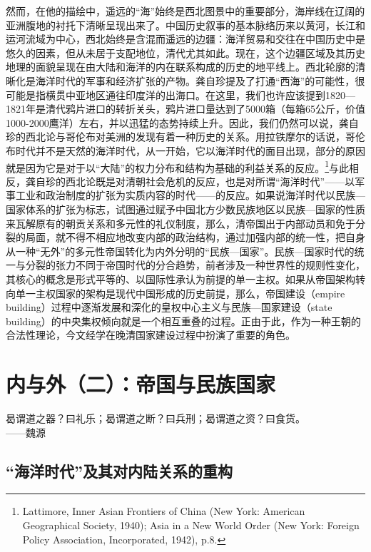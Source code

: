 \documentclass[a4paper, 12pt, openright]{ctexbook}
\renewenvironment{quote}
  {\list{}{\rightmargin2\ccwd \leftmargin2\ccwd \itemindent=2\ccwd \listparindent=2\ccwd}%
   \item\relax\small\kaishu\color{black}}
  {\endlist}
\begin{document}
然而，在他的描绘中，遥远的“海”始终是西北图景中的重要部分，海岸线在辽阔的亚洲腹地的衬托下清晰呈现出来了。中国历史叙事的基本脉络历来以黄河，长江和运河流域为中心，西北始终是含混而遥远的边疆：海洋贸易和交往在中国历史中是悠久的因素，但从未居于支配地位，清代尤其如此。现在，这个边疆区域及其历史地理的面貌呈现在由大陆和海洋的内在联系构成的历史的地平线上。西北轮廓的清晰化是海洋时代的军事和经济扩张的产物。龚自珍提及了打通“西海”的可能性，很可能是指横贯中亚地区通往印度洋的出海口。在这里，我们也许应该提到1820—1821年是清代鸦片进口的转折关头，鸦片进口量达到了5000箱（每箱65公斤，价值1000-2000鹰洋）左右，并以迅猛的态势持续上升。因此，我们仍然可以说，龚自珍的西北论与哥伦布对美洲的发现有着一种历史的关系。用拉铁摩尔的话说，哥伦布时代并不是天然的海洋时代，从一开始，它以海洋时代的面目出现，部分的原因就是因为它是对于以“大陆”的权力分布和结构为基础的利益关系的反应。\footnote{Lattimore, Inner Asian Frontiers of China (New York: American Geographical Society, 1940); Asia in a New World Order (New York: Foreign Policy Association, Incorporated, 1942), p.8.}与此相反，龚自珍的西北论既是对清朝社会危机的反应，也是对所谓“海洋时代”——以军事工业和政治制度的扩张为实质内容的时代——的反应。如果说海洋时代以民族—国家体系的扩张为标志，试图通过赋予中国北方少数民族地区以民族—国家的性质来瓦解原有的朝贡关系和多元性的礼仪制度，那么，清帝国出于内部动员和免于分裂的局面，就不得不相应地改变内部的政治结构，通过加强内部的统一性，把自身从一种“无外”的多元性帝国转化为内外分明的“民族—国家”。民族—国家时代的统一与分裂的张力不同于帝国时代的分合趋势，前者涉及一种世界性的规则性变化，其核心的概念是形式平等的、以国际性承认为前提的单一主权。如果从帝国架构转向单一主权国家的架构是现代中国形成的历史前提，那么，帝国建设（empire building）过程中逐渐发展和深化的皇权中心主义与民族—国家建设（state building）的中央集权倾向就是一个相互重叠的过程。正由于此，作为一种王朝的合法性理论，今文经学在晚清国家建设过程中扮演了重要的角色。

\chapter{内与外（二）：帝国与民族国家}

\begin{quote}
曷谓道之器？曰礼乐；曷谓道之断？曰兵刑；曷谓道之资？曰食货。\\
\hspace*{0pt}\hfill ——魏源
\end{quote}

\section{“海洋时代”及其对内陆关系的重构}
\end{document}
